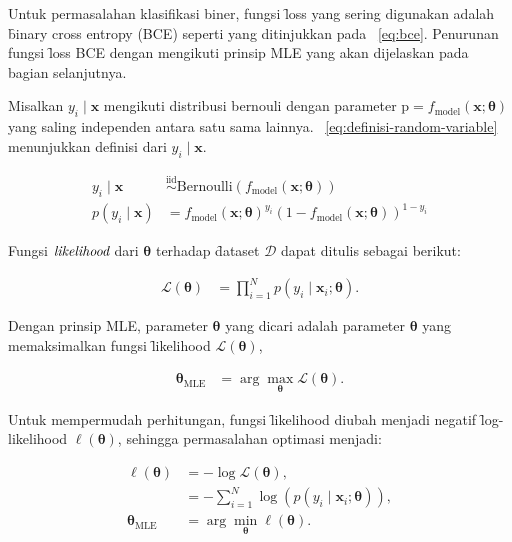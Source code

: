     Untuk permasalahan klasifikasi biner, fungsi \f{loss} yang sering digunakan adalah \f{binary cross entropy} (BCE) seperti yang ditinjukkan pada \equ~\ref{eq:bce}. Penurunan fungsi \f{loss} BCE dengan mengikuti prinsip MLE yang akan dijelaskan pada bagian selanjutnya.
    
    Misalkan $y_i \mid \mathbf{x}$ mengikuti distribusi bernouli dengan parameter $\text{p} = f_{\text{model}}(\mathbf{x};\bm{\theta})$ yang saling independen antara satu sama lainnya. \equ~\ref{eq:definisi-random-variable} menunjukkan definisi dari $y_i \mid \mathbf{x}$.

    \begin{align}
        \label{eq:definisi-random-variable}
        y_i \mid \mathbf{x} &\overset{\text{iid}}{\sim} \text{Bernoulli}(f_{\text{model}}(\mathbf{x};\bm{\theta})) \\
        p(y_i \mid \mathbf{x}) &= f_{\text{model}}(\mathbf{x};\bm{\theta})^{y_i} (1 - f_{\text{model}}(\mathbf{x};\bm{\theta}))^{1 - y_i} 
    \end{align} 

    Fungsi $\textit{likelihood}$ dari $\bm{\theta}$ terhadap \f{dataset} $\mathcal{D}$ dapat ditulis sebagai berikut:

    \begin{align}
        \mathcal{L}(\bm{\theta}) &= \prod_{i=1}^N p(y_i \mid \mathbf{x}_i; \bm{\theta}).
    \end{align}

    Dengan prinsip MLE, parameter $\bm{\theta}$ yang dicari adalah parameter $\bm{\theta}$ yang memaksimalkan fungsi \f{likelihood} $\mathcal{L}(\bm{\theta})$,

    \begin{align}
        \bm{\theta}_{\text{MLE}} &= \arg\max_{\bm{\theta}} \mathcal{L}(\bm{\theta}).
    \end{align}

    Untuk mempermudah perhitungan, fungsi \f{likelihood} diubah menjadi negatif \f{log-likelihood} $\mathcal{\ell}(\bm{\theta})$, sehingga permasalahan optimasi menjadi:

    \begin{align}
        \ell{(\bm{\theta})} &= -\log\mathcal{L}(\bm{\theta}), \\
        &= -\sum_{i=1}^N \log\left(p(y_i \mid \mathbf{x}_i; \bm{\theta})\right), \\
        \bm{\theta}_{\text{MLE}} &= \arg\min_{\bm{\theta}} \ell(\bm{\theta}).
    \end{align} 

